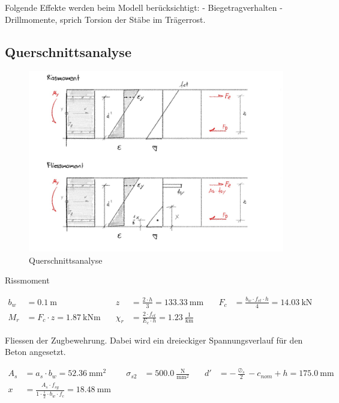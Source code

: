 \documentclass[
  11pt,
  letterpaper,
]{scrreprt}
\begin{document}
Folgende Effekte werden beim Modell berücksichtigt: - Biegetragverhalten
- Drillmomente, sprich Torsion der Stäbe im Trägerrost.

\subsection{Querschnittsanalyse}\label{querschnittsanalyse}

\begin{figure}[H]

{\centering \includegraphics{../imgs/thesis_skizzen-2.jpg}

}

\caption{Querschnittsanalyse}

\end{figure}%

Rissmoment

\[
\begin{aligned}
b_{w}& = 0.1 \ \mathrm{m} \quad & z& = \frac{2 \cdot h}{3} = 133.33 \ \mathrm{mm} \quad & F_{c}& = \frac{b_{w} \cdot f_{ct} \cdot h}{4} = 14.03 \ \mathrm{kN} \\ 
M_{r}& = F_{c} \cdot z = 1.87 \ \mathrm{kNm} \quad & \chi_{r}& = \frac{2 \cdot f_{ct}}{E_{c} \cdot h} = 1.23 \ \frac{1}{\mathrm{km}} \quad &  
 \end{aligned}
\]

Fliessen der Zugbewehrung. Dabei wird ein dreieckiger Spannungsverlauf
für den Beton angesetzt.

\[
\begin{aligned}
A_{s}& = a_{s} \cdot b_{w} = 52.36 \ \mathrm{mm}^{2} \quad & \sigma_{s 2}& = 500.0 \ \frac{\mathrm{N}}{\mathrm{mm}^{2}} \quad & {d}'& = - \frac{\oslash_{s}}{2} - c_{nom} + h = 175.0 \ \mathrm{mm} \\ 
x& = \frac{A_{s} \cdot f_{sy}}{1 \cdot \frac{1}{2} \cdot b_{w} \cdot f_{c}} = 18.48 \ \mathrm{mm} \quad &  \quad &  
 \end{aligned}
\]
\end{document}
